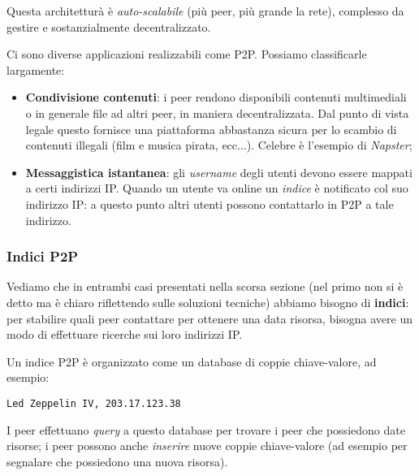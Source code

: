 \documentclass[a4paper,11pt]{article}
\begin{document}
Questa architetturà è \textit{auto-scalabile} (più peer, più grande la rete), complesso da gestire e sostanzialmente decentralizzato.

Ci sono diverse applicazioni realizzabili come P2P.
Possiamo classificarle largamente:
\begin{itemize}
	\item \textbf{Condivisione contenuti}: i peer rendono disponibili contenuti multimediali o in generale file ad altri peer, in maniera decentralizzata. Dal punto di vista legale questo fornisce una piattaforma abbastanza sicura per lo scambio di contenuti illegali (film e musica pirata, ecc...). Celebre è l'esempio di \textit{Napster};
	\item \textbf{Messaggistica istantanea}: gli \textit{username} degli utenti devono essere mappati a certi indirizzi IP. Quando un utente va online un \textit{indice} è notificato col suo indirizzo IP: a questo punto altri utenti possono contattarlo in P2P a tale indirizzo.
\end{itemize}

\subsubsection{Indici P2P}
Vediamo che in entrambi casi presentati nella scorsa sezione (nel primo non si è detto ma è chiaro riflettendo sulle soluzioni tecniche) abbiamo bisogno di \textbf{indici}: per stabilire quali peer contattare per ottenere una data risorsa, bisogna avere un modo di effettuare ricerche sui loro indirizzi IP.

Un indice P2P è organizzato come un database di coppie chiave-valore, ad esempio:
\begin{lstlisting}[style=shellstyle]
Led Zeppelin IV, 203.17.123.38
\end{lstlisting}

I peer effettuano \textit{query} a questo database per trovare i peer che possiedono date risorse; i peer possono anche \textit{inserire} nuove coppie chiave-valore (ad esempio per segnalare che possiedono una nuova risorsa).
\end{document}

